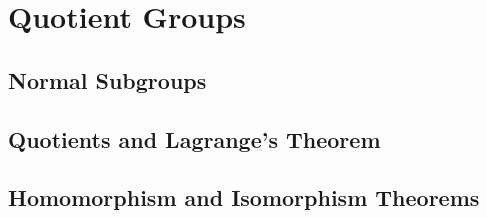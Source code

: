 \section{Quotient Groups} 

\subsection{Normal Subgroups} 

\subsection{Quotients and Lagrange's Theorem}

\subsection{Homomorphism and Isomorphism Theorems} 

